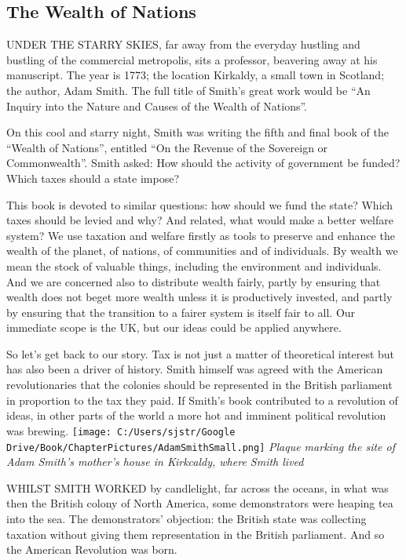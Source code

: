 \documentclass[]{tufte-handout}
\begin{document}
\hypertarget{the-wealth-of-nations}{%
\subsection{The Wealth of Nations}\label{the-wealth-of-nations}}

UNDER THE STARRY SKIES, far away from the everyday hustling and bustling
of the commercial metropolis, sits a professor, beavering away at his
manuscript. The year is 1773; the location Kirkaldy, a small town in
Scotland; the author, Adam Smith. The full title of Smith's great work
would be ``An Inquiry into the Nature and Causes of the Wealth of
Nations''.

On this cool and starry night, Smith was writing the fifth and final
book of the ``Wealth of Nations'', entitled ``On the Revenue of the
Sovereign or Commonwealth''. Smith asked: How should the activity of
government be funded? Which taxes should a state impose?

This book is devoted to similar questions: how should we fund the state?
Which taxes should be levied and why? And related, what would make a
better welfare system? We use taxation and welfare firstly as tools to
preserve and enhance the wealth of the planet, of nations, of
communities and of individuals. By wealth we mean the stock of valuable
things, including the environment and individuals. And we are concerned
also to distribute wealth fairly, partly by ensuring that wealth does
not beget more wealth unless it is productively invested, and partly by
ensuring that the transition to a fairer system is itself fair to all.
Our immediate scope is the UK, but our ideas could be applied anywhere.

So let's get back to our story. Tax is not just a matter of theoretical
interest but has also been a driver of history. Smith himself was agreed
with the American revolutionaries that the colonies should be
represented in the British parliament in proportion to the tax they
paid. If Smith's book contributed to a revolution of ideas, in other
parts of the world a more hot and imminent political revolution was
brewing.
\texttt{[image: C:/Users/sjstr/Google Drive/Book/ChapterPictures/AdamSmithSmall.png]}
\emph{Plaque marking the site of Adam Smith's mother's house in
Kirkcaldy, where Smith lived}

WHILST SMITH WORKED by candlelight, far across the oceans, in what was
then the British colony of North America, some demonstrators were
heaping tea into the sea. The demonstrators' objection: the British
state was collecting taxation without giving them representation in the
British parliament. And so the American Revolution was born.
\end{document}
